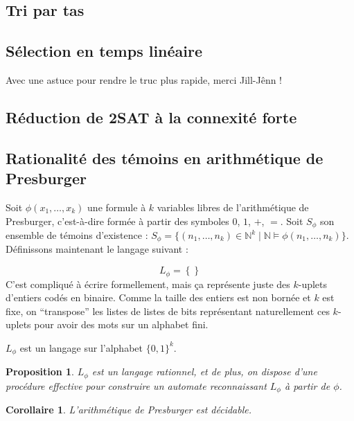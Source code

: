 \documentclass[a4paper, 11pt]{article}
\def\N{\mathbb{N}}
\newtheorem*{proposition}{Proposition}
\newtheorem*{corollary}{Corollaire}
\begin{document}
\subsection{Tri par tas}

\subsection{Sélection en temps linéaire}

Avec une astuce pour rendre le truc plus rapide, merci Jill-Jênn !

\subsection{Réduction de 2SAT à la connexité forte}

\subsection{Rationalité des témoins en arithmétique de Presburger}

Soit $\phi(x_1,\ldots,x_k)$ une formule à $k$ variables libres de l'arithmétique
de Presburger, c'est-à-dire formée à partir des symboles $0$, $1$, $+$, $=$.
Soit $S_\phi$ son ensemble de témoins d'existence : $S_\phi = \{ (n_1, \ldots,
n_k) \in \N^k \mid \N \models \phi(n_1, \ldots, n_k) \}$. Définissons maintenant
le langage suivant :

\[ L_\phi = \left\{  \right\}\]
C'est compliqué à écrire formellement, mais ça représente juste des $k$-uplets
d'entiers codés en binaire. Comme la taille des entiers est non bornée et $k$
est fixe, on \enquote{transpose} les listes de listes de bits représentant
naturellement ces $k$-uplets pour avoir des mots sur un alphabet fini.

$L_\phi$ est un langage sur l'alphabet $\{0,1\}^k$.

\begin{proposition}
  $L_\phi$ est un langage rationnel, et de plus, on dispose d'une procédure
  effective pour construire un automate reconnaissant $L_\phi$ à partir de
  $\phi$.
\end{proposition}

\begin{corollary}
  L'arithmétique de Presburger est décidable.
\end{corollary}

\subsection{}
\end{document}
